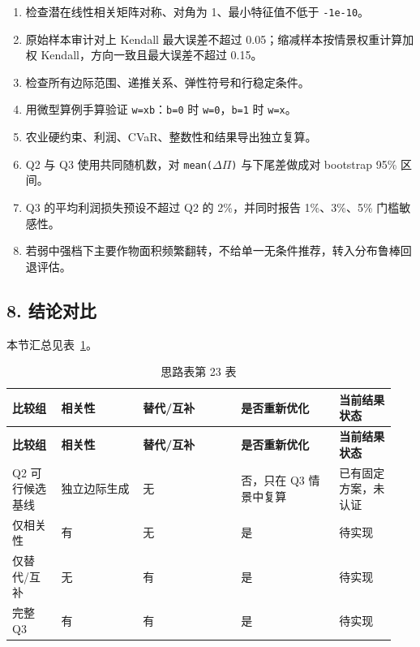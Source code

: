 \documentclass[UTF8,11pt,a4paper]{ctexart}
\begin{document}
\begin{enumerate}
\item 检查潜在线性相关矩阵对称、对角为 1、最小特征值不低于 \texttt{-1e-10}。
\item 原始样本审计对上 Kendall 最大误差不超过 0.05；缩减样本按情景权重计算加权 Kendall，方向一致且最大误差不超过 0.15。
\item 检查所有边际范围、递推关系、弹性符号和行稳定条件。
\item 用微型算例手算验证 \texttt{w=xb}：\texttt{b=0} 时 \texttt{w=0}，\texttt{b=1} 时 \texttt{w=x}。
\item 农业硬约束、利润、CVaR、整数性和结果导出独立复算。
\item Q2 与 Q3 使用共同随机数，对 \texttt{mean(\ensuremath{\Delta{}}\ensuremath{\Pi{}})} 与下尾差做成对 bootstrap 95\% 区间。
\item Q3 的平均利润损失预设不超过 Q2 的 2\%，并同时报告 1\%、3\%、5\% 门槛敏感性。
\item 若弱中强档下主要作物面积频繁翻转，不给单一无条件推荐，转入分布鲁棒回退评估。
\end{enumerate}

\subsection{8. 结论对比}

\noindent 本节汇总见表~\ref{tab:thought-23}。
\begin{longtable}{@{}>{\raggedright\arraybackslash}p{0.12\linewidth}>{\raggedright\arraybackslash}p{0.20\linewidth}>{\raggedright\arraybackslash}p{0.24\linewidth}>{\raggedright\arraybackslash}p{0.24\linewidth}>{\raggedright\arraybackslash}p{0.14\linewidth}@{}}
\caption{思路表第 23 表}\label{tab:thought-23}\\
\toprule
\textbf{比较组} & \textbf{相关性} & \textbf{替代/互补} & \textbf{是否重新优化} & \textbf{当前结果状态} \\
\midrule
\endfirsthead
\toprule
\textbf{比较组} & \textbf{相关性} & \textbf{替代/互补} & \textbf{是否重新优化} & \textbf{当前结果状态} \\
\midrule
\endhead
Q2 可行候选基线 & 独立边际生成 & 无 & 否，只在 Q3 情景中复算 & 已有固定方案，未认证 \\
仅相关性 & 有 & 无 & 是 & 待实现 \\
仅替代/互补 & 无 & 有 & 是 & 待实现 \\
完整 Q3 & 有 & 有 & 是 & 待实现 \\
\bottomrule
\end{longtable}
\end{document}
